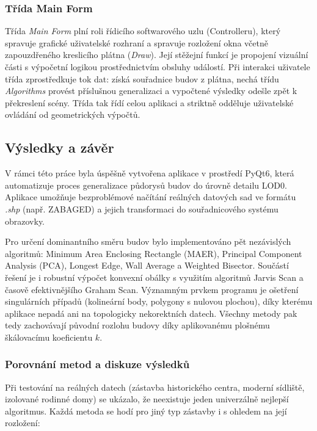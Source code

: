 \subsubsection{Třída Main Form}
Třída \textit{Main Form} plní roli řídicího softwarového uzlu (Controlleru), který spravuje grafické uživatelské rozhraní a spravuje rozložení okna včetně zapouzdřeného kreslicího plátna (\textit{Draw}). Její stěžejní funkcí je propojení vizuální části s výpočetní logikou prostřednictvím obsluhy událostí. Při interakci uživatele třída zprostředkuje tok dat: získá souřadnice budov z plátna, nechá třídu \textit{Algorithms} provést příslušnou generalizaci a vypočtené výsledky odešle zpět k překreslení scény. Třída tak řídí celou aplikaci a striktně odděluje uživatelské ovládání od geometrických výpočtů.

\newpage
\subsection{Výsledky a závěr}
V rámci této práce byla úspěšně vytvořena aplikace v prostředí PyQt6, která automatizuje proces generalizace půdorysů budov do úrovně detailu LOD0. Aplikace umožňuje bezproblémové načítání reálných datových sad ve formátu \textit{.shp} (např. ZABAGED) a jejich transformaci do souřadnicového systému obrazovky.

Pro určení dominantního směru budov bylo implementováno pět nezávislých algoritmů: Minimum Area Enclosing Rectangle (MAER), Principal Component Analysis (PCA), Longest Edge, Wall Average a Weighted Bisector. Součástí řešení je i robustní výpočet konvexní obálky s využitím algoritmů Jarvis Scan a časově efektivnějšího Graham Scan. Významným prvkem programu je ošetření singulárních případů (kolineární body, polygony s nulovou plochou), díky kterému aplikace nepadá ani na topologicky nekorektních datech. Všechny metody pak tedy zachovávají původní rozlohu budovy díky aplikovanému plošnému škálovacímu koeficientu $k$.

\subsubsection*{Porovnání metod a diskuze výsledků}

Při testování na reálných datech (zástavba historického centra, moderní sídliště, izolované rodinné domy) se ukázalo, že neexistuje jeden univerzálně nejlepší algoritmus. Každá metoda se hodí pro jiný typ zástavby i s ohledem na její rozložení:

